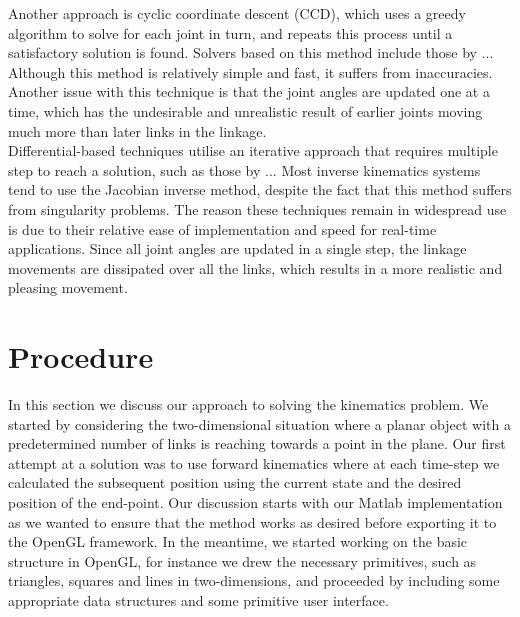\documentclass[paper=a4, fontsize=11pt]{scrartcl} %
\numberwithin{equation}{section} %
\numberwithin{figure}{section} %
\numberwithin{table}{section} %
\begin{document}
Another approach is cyclic coordinate descent (CCD), which uses a greedy algorithm to solve for each joint in turn, and repeats this process until a satisfactory solution is found. Solvers based on this method include those by ... Although this method is relatively simple and fast, it suffers from inaccuracies. Another issue with this technique is that the joint angles are updated one at a time, which has the undesirable and unrealistic result of earlier joints moving much more than later links in the linkage. \\

Differential-based techniques utilise an iterative approach that requires multiple step to reach a solution, such as those by ... Most inverse kinematics systems tend to use the Jacobian inverse method, despite the fact that this method suffers from singularity problems. The reason these techniques remain in widespread use is due to their relative ease of implementation and speed for real-time applications. Since all joint angles are updated in a single step, the linkage movements are dissipated over all the links, which results in a more realistic and pleasing movement. 




\section{Procedure}
In this section we discuss our approach to solving the kinematics problem. We started by considering the two-dimensional situation where a planar object with a predetermined number of links is reaching towards a point in the plane. Our first attempt at a solution was to use forward kinematics where at each time-step we calculated the subsequent position using the current state and the desired position of the end-point. Our discussion starts with our Matlab implementation as we wanted to ensure that the method works as desired before exporting it to the OpenGL framework. In the meantime, we started working on the basic structure in OpenGL, for instance we drew the necessary primitives, such as triangles, squares and lines in two-dimensions, and proceeded by including some appropriate data structures and some primitive user interface. \\
\end{document}

